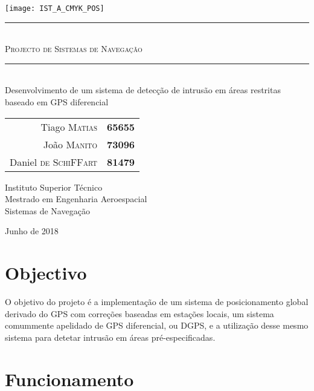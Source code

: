 \documentclass{article}
\begin{document}
\thispagestyle{empty}


\texttt{[image: IST\_A\_CMYK\_POS]}
	
\begin{center}
	\vspace{70mm} %
	\rule{\linewidth}{0.5pt} \\
    \vspace{2mm}
	\Huge \textsc{Projecto de Sistemas de Navegação} \\
	\rule{\linewidth}{2pt} \\
	\vspace{8mm} %
	\LARGE Desenvolvimento de um sistema de detecção de intrusão em áreas restritas baseado em GPS diferencial
	
	\vspace{\fill} %
	
	\normalsize
	\begin{tabular}{r l}
		Tiago \textsc{Matias} & \textbf{65655} \\
		João \textsc{Manito} & \textbf{73096} \\
		Daniel \textsc{de Schi}{\footnotesize FF}\textsc{art} & \textbf{81479}
	\end{tabular}
	
	\vspace{10mm} %
	\Large Instituto Superior Técnico \\
	Mestrado em Engenharia Aeroespacial \\
	\vspace{1mm}
	\large Sistemas de Navegação
	
	\vspace{10mm} %
	\Large Junho de 2018
\end{center}

\newpage

\section{Objectivo}

O objetivo do projeto é a implementação de um sistema de
posicionamento global derivado do GPS com correções baseadas em
estações locais, um sistema comummente apelidado de GPS diferencial,
ou DGPS, e a utilização desse mesmo sistema para detetar intrusão em
áreas pré-especificadas.

\section{Funcionamento}
\end{document}
